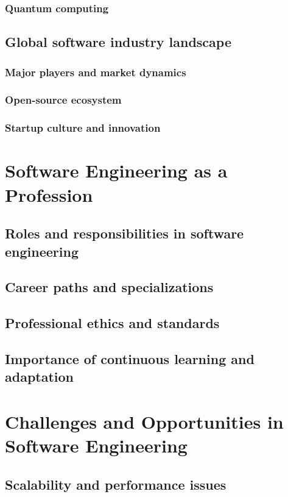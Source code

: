 \subsubsection{Quantum computing}
\subsection{Global software industry landscape}
\subsubsection{Major players and market dynamics}
\subsubsection{Open-source ecosystem}
\subsubsection{Startup culture and innovation}

\newpage

\section{Software Engineering as a Profession}
\subsection{Roles and responsibilities in software engineering}
\subsection{Career paths and specializations}
\subsection{Professional ethics and standards}
\subsection{Importance of continuous learning and adaptation}

\newpage

\section{Challenges and Opportunities in Software Engineering}
\subsection{Scalability and performance issues}
